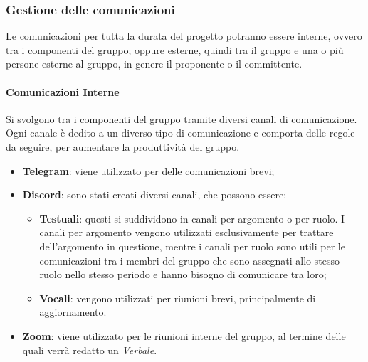 \subsubsection{Gestione delle comunicazioni}
Le comunicazioni per tutta la durata del progetto potranno essere interne, ovvero tra i componenti del gruppo;
oppure esterne, quindi tra il gruppo e una o più persone esterne al gruppo, in genere il proponente o il committente.

\paragraph{Comunicazioni Interne}
Si svolgono tra i componenti del gruppo tramite diversi canali di comunicazione. 
Ogni canale è dedito a un diverso tipo di comunicazione e comporta delle regole da seguire, per aumentare la 
produttività del gruppo.

\begin{itemize}
    \item \textbf{Telegram}: viene utilizzato per delle comunicazioni brevi;
    \item \textbf{Discord}: sono stati creati diversi canali, che possono essere:
    \begin{itemize}
        \item \textbf{Testuali}: questi si suddividono in canali per argomento o per ruolo. I canali per argomento vengono utilizzati 
        esclusivamente per trattare dell'argomento in questione, mentre i canali per ruolo sono utili per le comunicazioni tra i membri del gruppo che
        sono assegnati allo stesso ruolo nello stesso periodo e hanno bisogno di comunicare tra loro;
        \item \textbf{Vocali}: vengono utilizzati per riunioni brevi, principalmente di aggiornamento.
    \end{itemize}
    \item \textbf{Zoom}: viene utilizzato per le riunioni interne del gruppo, al termine delle quali verrà redatto un \textit{Verbale}.
\end{itemize}

